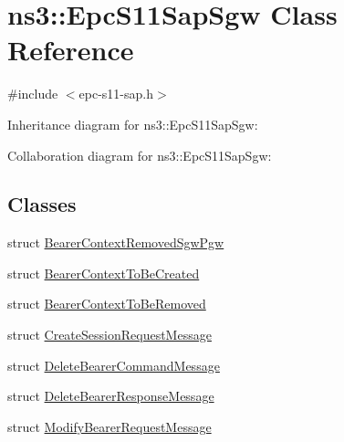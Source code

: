 \hypertarget{classns3_1_1EpcS11SapSgw}{}\section{ns3\+:\+:Epc\+S11\+Sap\+Sgw Class Reference}
\label{classns3_1_1EpcS11SapSgw}


{\ttfamily \#include $<$epc-\/s11-\/sap.\+h$>$}



Inheritance diagram for ns3\+:\+:Epc\+S11\+Sap\+Sgw\+:


Collaboration diagram for ns3\+:\+:Epc\+S11\+Sap\+Sgw\+:
\subsection*{Classes}
\begin{DoxyCompactItemize}
\item 
struct \hyperlink{structns3_1_1EpcS11SapSgw_1_1BearerContextRemovedSgwPgw}{Bearer\+Context\+Removed\+Sgw\+Pgw}
\item 
struct \hyperlink{structns3_1_1EpcS11SapSgw_1_1BearerContextToBeCreated}{Bearer\+Context\+To\+Be\+Created}
\item 
struct \hyperlink{structns3_1_1EpcS11SapSgw_1_1BearerContextToBeRemoved}{Bearer\+Context\+To\+Be\+Removed}
\item 
struct \hyperlink{structns3_1_1EpcS11SapSgw_1_1CreateSessionRequestMessage}{Create\+Session\+Request\+Message}
\item 
struct \hyperlink{structns3_1_1EpcS11SapSgw_1_1DeleteBearerCommandMessage}{Delete\+Bearer\+Command\+Message}
\item 
struct \hyperlink{structns3_1_1EpcS11SapSgw_1_1DeleteBearerResponseMessage}{Delete\+Bearer\+Response\+Message}
\item 
struct \hyperlink{structns3_1_1EpcS11SapSgw_1_1ModifyBearerRequestMessage}{Modify\+Bearer\+Request\+Message}
\end{DoxyCompactItemize}
